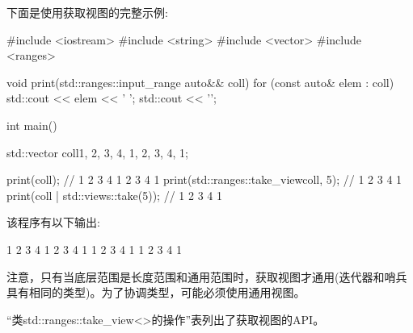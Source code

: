 下面是使用获取视图的完整示例:


\begin{cpp}
#include <iostream>
#include <string>
#include <vector>
#include <ranges>

void print(std::ranges::input_range auto&& coll)
{
	for (const auto& elem : coll) {
		std::cout << elem << ' ';
	}
	std::cout << '\n';
}

int main()
{
	std::vector coll{1, 2, 3, 4, 1, 2, 3, 4, 1};
	
	print(coll); // 1 2 3 4 1 2 3 4 1
	print(std::ranges::take_view{coll, 5}); // 1 2 3 4 1
	print(coll | std::views::take(5)); // 1 2 3 4 1
}
\end{cpp}

该程序有以下输出:

\begin{shell}
1 2 3 4 1 2 3 4 1
1 2 3 4 1
1 2 3 4 1
\end{shell}


注意，只有当底层范围是长度范围和通用范围时，获取视图才通用(迭代器和哨兵具有相同的类型)。为了协调类型，可能必须使用通用视图。


“类std::ranges::take\_view<>的操作”表列出了获取视图的API。


